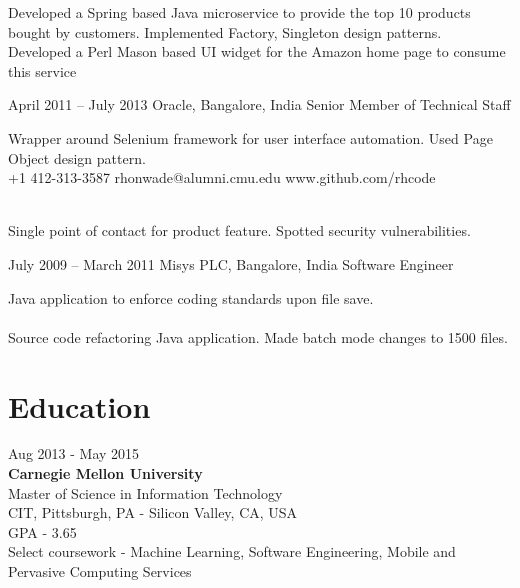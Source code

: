 \documentclass{tccv}
\begin{document}
\begin{eventlist}
Developed a Spring based Java microservice to provide the top 10 products bought by customers. Implemented Factory, Singleton design patterns.\\

Developed a Perl Mason based UI widget for the Amazon home page to consume this service

\item{April 2011 -- July 2013}
     {Oracle, Bangalore, India}
     {Senior Member of Technical Staff}

Wrapper around Selenium framework for user interface automation. Used Page Object design pattern.\\

    {+1 412-313-3587}
    {rhonwade@alumni.cmu.edu}
    {www.github.com/rhcode}

\\

Single point of contact for product feature. Spotted security vulnerabilities.

\item{July 2009 -- March 2011}
     {Misys PLC, Bangalore, India}
     {Software Engineer}

Java application to enforce coding standards upon file save.\\
\\

Source code refactoring Java application. Made batch mode changes to 1500 files.\\
\end{eventlist}

\vspace{-0.2in}
\section{Education}

{\hfill\sc Aug 2013 - May 2015}\\
\textbf{Carnegie Mellon University}\\ 
Master of Science in Information Technology\\
CIT, Pittsburgh, PA - Silicon Valley, CA, USA\\
GPA - 3.65\\
Select coursework - Machine Learning, Software Engineering, Mobile and Pervasive Computing Services\\
\end{document}
